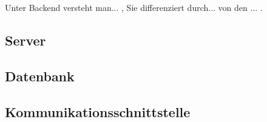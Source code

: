 Unter Backend versteht man... , Sie differenziert durch... von den ... .

\subsection{Server}


\subsection{Datenbank}


\subsection{Kommunikationsschnittstelle}


